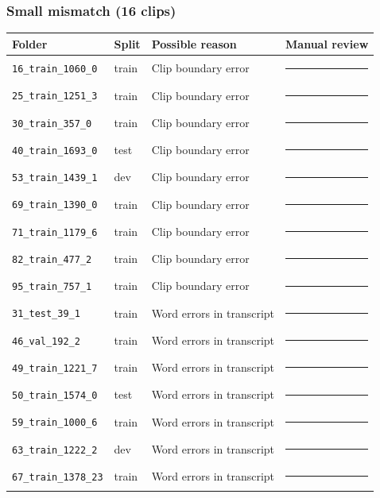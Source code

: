 \documentclass[11pt]{article}
\begin{document}
\subsubsection*{Small mismatch (16 clips)}
\begin{center}\begin{tabular}{@{}p{} p{} p{} p{}@{}}
\toprule
\textbf{Folder} & \textbf{Split} & \textbf{Possible reason} & \textbf{Manual review}\\
\midrule
\texttt{16\_train\_1060\_0} & train & Clip boundary error & \rule{0.28\textwidth}{0.4pt}\\
\texttt{25\_train\_1251\_3} & train & Clip boundary error & \rule{0.28\textwidth}{0.4pt}\\
\texttt{30\_train\_357\_0} & train & Clip boundary error & \rule{0.28\textwidth}{0.4pt}\\
\texttt{40\_train\_1693\_0} & test & Clip boundary error & \rule{0.28\textwidth}{0.4pt}\\
\texttt{53\_train\_1439\_1} & dev & Clip boundary error & \rule{0.28\textwidth}{0.4pt}\\
\texttt{69\_train\_1390\_0} & train & Clip boundary error & \rule{0.28\textwidth}{0.4pt}\\
\texttt{71\_train\_1179\_6} & train & Clip boundary error & \rule{0.28\textwidth}{0.4pt}\\
\texttt{82\_train\_477\_2} & train & Clip boundary error & \rule{0.28\textwidth}{0.4pt}\\
\texttt{95\_train\_757\_1} & train & Clip boundary error & \rule{0.28\textwidth}{0.4pt}\\
\texttt{31\_test\_39\_1} & train & Word errors in transcript & \rule{0.28\textwidth}{0.4pt}\\
\texttt{46\_val\_192\_2} & train & Word errors in transcript & \rule{0.28\textwidth}{0.4pt}\\
\texttt{49\_train\_1221\_7} & train & Word errors in transcript & \rule{0.28\textwidth}{0.4pt}\\
\texttt{50\_train\_1574\_0} & test & Word errors in transcript & \rule{0.28\textwidth}{0.4pt}\\
\texttt{59\_train\_1000\_6} & train & Word errors in transcript & \rule{0.28\textwidth}{0.4pt}\\
\texttt{63\_train\_1222\_2} & dev & Word errors in transcript & \rule{0.28\textwidth}{0.4pt}\\
\texttt{67\_train\_1378\_23} & train & Word errors in transcript & \rule{0.28\textwidth}{0.4pt}\\
\bottomrule\end{tabular}\end{center}
\end{document}
